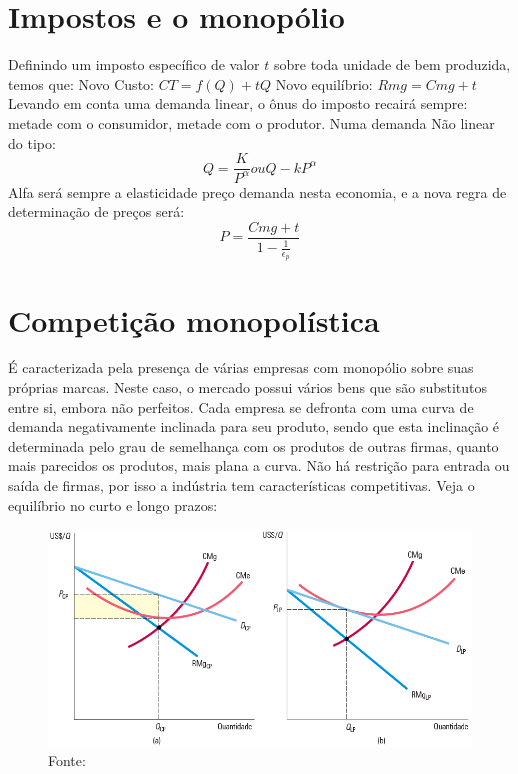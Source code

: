\documentclass[12pt,a4paper,oneside,brazil]{abntex2}
\begin{document}
\section{Impostos e o monopólio}
Definindo um imposto específico de valor $t$ sobre toda unidade de bem produzida, temos que: \newline
Novo Custo: $CT = f(Q) + t Q$ \newline
Novo equilíbrio: $Rmg = Cmg + t$ \newline
Levando em conta uma demanda linear, o ônus do imposto recairá sempre: metade com o consumidor, metade com o produtor. Numa demanda Não linear do tipo:
\[ Q = \frac{K}{P^\alpha} ou Q - k P^\alpha \]
Alfa será sempre a elasticidade preço demanda nesta economia, e a nova regra de determinação de preços será:
\[ P = \frac{Cmg + t}{1 - \frac{1}{\epsilon_p}}\]

\section{Competição monopolística}
É caracterizada pela presença de várias empresas com monopólio sobre suas próprias marcas. Neste caso, o mercado possui vários bens que são substitutos entre si, embora não perfeitos. Cada empresa se defronta com uma curva de demanda negativamente inclinada para seu produto, sendo que esta inclinação é determinada pelo grau de semelhança com os produtos de outras firmas, quanto mais parecidos os produtos, mais plana a curva. Não há restrição para entrada ou saída de firmas, por isso a indústria tem características competitivas. Veja o equilíbrio no curto e longo prazos:

\begin{figure}[h]
	\includegraphics[scale = 0.7]{Competição monopolística.png}
	\centering
	\caption{Fonte: \cite[p. 450]{pindyck}}
\end{figure}
\end{document}
